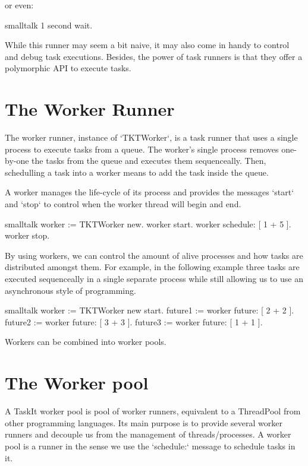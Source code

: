 \documentclass[10pt,twoside,english]{_support/latex/sbabook/sbabook}
\begin{document}
or even:

\begin{displaycode}{smalltalk}
1 second wait.
\end{displaycode}

While this runner may seem a bit naive, it may also come in handy to control and debug task executions. Besides, the power of task runners is that they offer a polymorphic API to execute tasks.
\section{The Worker Runner}
The worker runner, instance of `TKTWorker`, is a task runner that uses a single process to execute tasks from a queue. The worker's single process removes one-by-one the tasks from the queue and executes them sequenceally. Then, schedulling a task into a worker means to add the task inside the queue.

A worker manages the life-cycle of its process and provides the messages `start` and `stop` to control when the worker thread will begin and end.

\begin{displaycode}{smalltalk}
worker := TKTWorker new.
worker start.
worker schedule: [ 1 + 5 ].
worker stop.
\end{displaycode}

By using workers, we can control the amount of alive processes and how tasks are distributed amongst them. For example, in the following example three tasks are executed sequenceally in a single separate process while still allowing us to use an asynchronous style of programming.

\begin{displaycode}{smalltalk}
worker := TKTWorker new start.
future1 := worker future: [ 2 + 2 ].
future2 := worker future: [ 3 + 3 ].
future3 := worker future: [ 1 + 1 ].
\end{displaycode}

Workers can be combined into worker pools.
\section{The Worker pool}
A TaskIt worker pool is pool of worker runners, equivalent to a ThreadPool from other programming languages. Its main purpose is to provide several worker runners and decouple us from the management of threads/processes. A worker pool is a runner in the sense we use the `schedule:` message to schedule tasks in it. 
\end{document}
